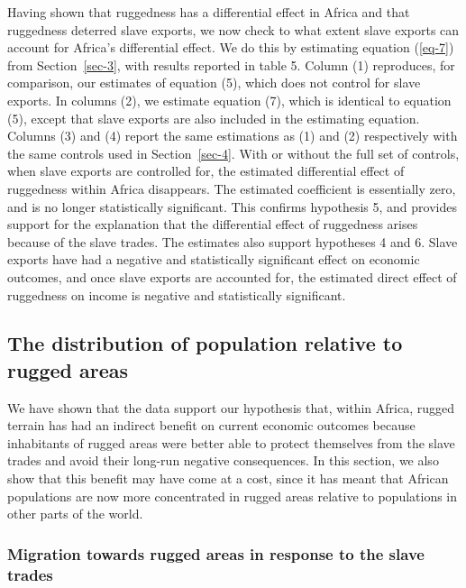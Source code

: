 \documentclass[
  letterpaper,
  DIV=11,
  numbers=noendperiod]{scrartcl}
\begin{document}
Having shown that ruggedness has a differential effect in Africa and
that ruggedness deterred slave exports, we now check to what extent
slave exports can account for Africa's differential effect. We do this
by estimating equation (\ref{eq-7}) from Section~\ref{sec-3}, with
results reported in table 5. Column (1) reproduces, for comparison, our
estimates of equation (5), which does not control for slave exports. In
columns (2), we estimate equation (7), which is identical to equation
(5), except that slave exports are also included in the estimating
equation. Columns (3) and (4) report the same estimations as (1) and (2)
respectively with the same controls used in Section~\ref{sec-4}. With or
without the full set of controls, when slave exports are controlled for,
the estimated differential effect of ruggedness within Africa
disappears. The estimated coefficient is essentially zero, and is no
longer statistically significant. This confirms hypothesis 5, and
provides support for the explanation that the differential effect of
ruggedness arises because of the slave trades. The estimates also
support hypotheses 4 and 6. Slave exports have had a negative and
statistically significant effect on economic outcomes, and once slave
exports are accounted for, the estimated direct effect of ruggedness on
income is negative and statistically significant.

\subsection{The distribution of population relative to rugged
areas}\label{the-distribution-of-population-relative-to-rugged-areas}

We have shown that the data support our hypothesis that, within Africa,
rugged terrain has had an indirect benefit on current economic outcomes
because inhabitants of rugged areas were better able to protect
themselves from the slave trades and avoid their long-run negative
consequences. In this section, we also show that this benefit may have
come at a cost, since it has meant that African populations are now more
concentrated in rugged areas relative to populations in other parts of
the world.

\subsubsection{Migration towards rugged areas in response to the slave
trades}\label{migration-towards-rugged-areas-in-response-to-the-slave-trades}
\end{document}

